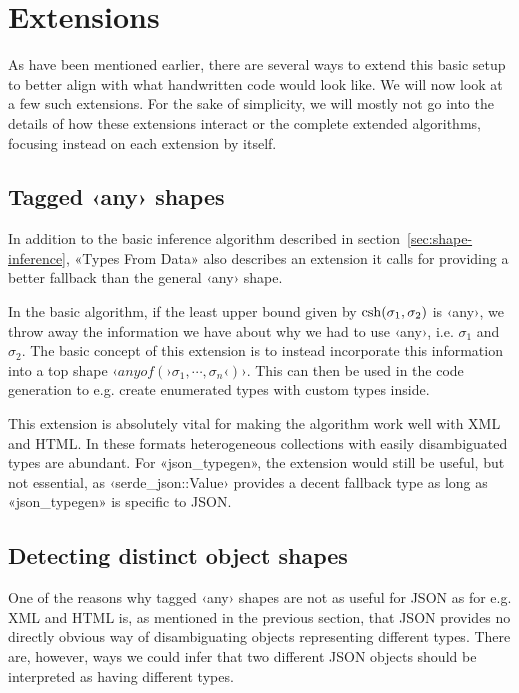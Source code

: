 \section{Extensions}
\label{sec:extensions}

As have been mentioned earlier, there are several ways to extend this basic setup to better align with what handwritten code would look like. We will now look at a few such extensions. For the sake of simplicity, we will mostly not go into the details of how these extensions interact or the complete extended algorithms, focusing instead on each extension by itself.

\subsection{Tagged ‹any› shapes}
\label{sec:tagged-any}

In addition to the basic inference algorithm described in section~\ref{sec:shape-inference}, «Types From Data» \cite{fsharp-types-from-data} also describes an extension it calls  for providing a better fallback than the general ‹any› shape.

In the basic algorithm, if the least upper bound given by $\operatorname{csh}(\sigma_1, \sigma_2)$ is ‹any›, we throw away the information we have about why we had to use ‹any›, i.e. $\sigma_1$ and $\sigma_2$. The basic concept of this extension is to instead incorporate this information into a top shape $‹anyof(›\sigma_1, {\cdots}, \sigma_n‹)›$. This can then be used in the code generation to e.g. create enumerated types with custom types inside.



This extension is absolutely vital for making the algorithm work well with XML and HTML. In these formats heterogeneous collections with easily disambiguated types are abundant. For «json_typegen», the extension would still be useful, but not essential, as ‹serde_json::Value› provides a decent fallback type as long as «json_typegen» is specific to JSON.

\subsection{Detecting distinct object shapes}

One of the reasons why tagged ‹any› shapes are not as useful for JSON as for e.g. XML and HTML is, as mentioned in the previous section, that JSON provides no directly obvious way of disambiguating objects representing different types. There are, however, ways we could infer that two different JSON objects should be interpreted as having different types.

